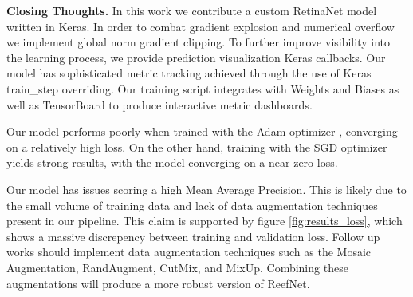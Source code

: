 \documentclass{article}
\begin{document}
\textbf{Closing Thoughts.} In this work we contribute a custom RetinaNet model written in Keras. In order to combat gradient explosion and numerical overflow we implement global norm gradient clipping. To further improve visibility into the learning process, we provide prediction visualization Keras callbacks. Our model has sophisticated metric tracking achieved through the use of Keras train\_step overriding.  Our training script integrates with Weights and Biases as well as TensorBoard to produce interactive metric dashboards.

Our model performs poorly when trained with the Adam optimizer \cite{adamoptimizer}, converging on a relatively high loss. On the other hand, training with the SGD optimizer \cite{ruder2016overview} yields strong results, with the model converging on a near-zero loss.

Our model has issues scoring a high Mean Average Precision.
This is likely due to the small volume of training data and lack of data augmentation techniques present in our pipeline.
This claim is supported by figure \ref{fig:results_loss}, which shows a massive discrepency between training and validation loss.
Follow up works should implement data augmentation techniques such as the Mosaic Augmentation, RandAugment, CutMix, and MixUp.
Combining these augmentations will produce a more robust version of ReefNet.

\printbibliography
\end{document}
